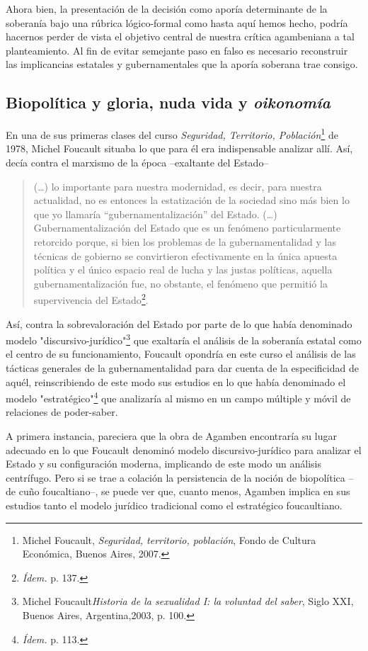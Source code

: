 \documentclass{book}
\begin{document}
Ahora bien, la presentación de la decisión como aporía determinante de
la soberanía bajo una rúbrica lógico-formal como hasta aquí hemos hecho,
podría hacernos perder de vista el objetivo central de nuestra crítica
agambeniana a tal planteamiento. Al fin de evitar semejante paso en
falso es necesario reconstruir las implicancias estatales y
gubernamentales que la aporía soberana trae consigo.

\subsection{Biopolítica y gloria, nuda vida y \emph{oikonomía}}

En una de sus primeras clases del curso \emph{Seguridad, Territorio,
Población}\footnote{Michel Foucault, \emph{Seguridad, territorio,
  población}, Fondo de Cultura Económica, Buenos Aires, 2007.} de 1978,
Michel Foucault situaba lo que para él era indispensable analizar allí.
Así, decía contra el marxismo de la época --exaltante del Estado--

\begin{quote}
(\dots) lo importante para nuestra modernidad, es decir, para
nuestra actualidad, no es entonces la estatización de la sociedad sino
más bien lo que yo llamaría ``gubernamentalización'' del Estado.
(\dots) Gubernamentalización del Estado que es un fenómeno
particularmente retorcido porque, si bien los problemas de la
gubernamentalidad y las técnicas de gobierno se convirtieron
efectivamente en la única apuesta política y el único espacio real de
lucha y las justas políticas, aquella gubernamentalización fue, no
obstante, el fenómeno que permitió la supervivencia del
Estado\footnote{\emph{Ídem.} p. 137.}.
\end{quote}

Así, contra la sobrevaloración del Estado por parte de lo que había
denominado modelo "discursivo-jurídico"\footnote{Michel
  Foucault\emph{Historia de la sexualidad I: la voluntad del saber},
  Siglo XXI, Buenos Aires, Argentina,2003, p. 100.} que exaltaría el
análisis de la soberanía estatal como el centro de su funcionamiento,
Foucault opondría en este curso el análisis de las tácticas generales de
la gubernamentalidad para dar cuenta de la especificidad de aquél,
reinscribiendo de este modo sus estudios en lo que había denominado el
modelo "estratégico"\footnote{\emph{Ídem.} p. 113.} que analizaría al
mismo en un campo múltiple y móvil de relaciones de poder-saber.

A primera instancia, pareciera que la obra de Agamben encontraría su
lugar adecuado en lo que Foucault denominó modelo discursivo-jurídico
para analizar el Estado y su configuración moderna, implicando de este
modo un análisis centrífugo. Pero si se trae a colación la persistencia
de la noción de biopolítica --de cuño foucaltiano--, se puede ver que,
cuanto menos, Agamben implica en sus estudios tanto el modelo jurídico
tradicional como el estratégico foucaultiano.
\end{document}
